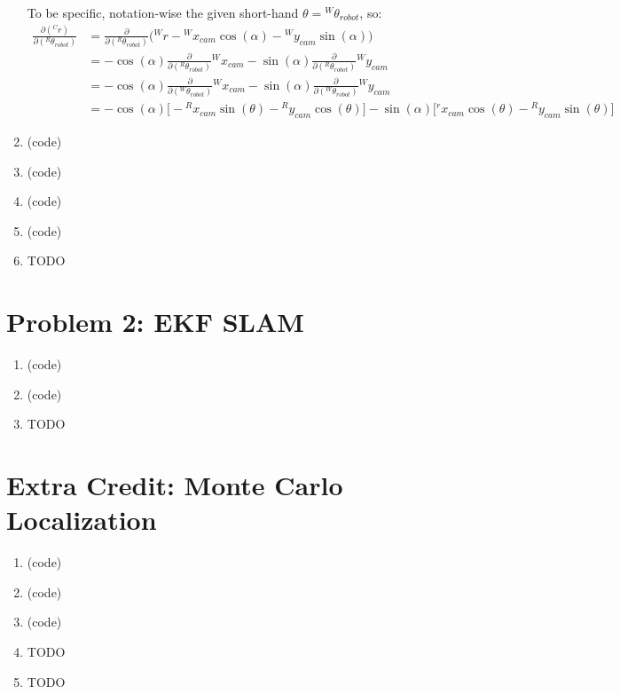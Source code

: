\documentclass{article}
\begin{document}
\begin{enumerate}[label=(\roman*)]
To be specific, notation-wise the given short-hand $\theta = {}^W\theta_{robot}$, so:
\begin{equation}
\begin{aligned}
\frac{\partial ({}^C r)}{\partial ({}^R \theta_{robot})}
&= \frac{\partial}{\partial ({}^R \theta_{robot})} \Big( {}^W r - {}^W x_{cam} \cos(\alpha) - {}^W y_{cam} \sin(\alpha) \Big) \\
&= -\cos(\alpha) \frac{\partial}{\partial ({}^R \theta_{robot})} {}^Wx_{cam} - \sin(\alpha) \frac{\partial}{\partial ({}^R \theta_{robot})} {}^Wy_{cam} \\
&= -\cos(\alpha) \frac{\partial}{\partial ({}^W \theta_{robot})} {}^Wx_{cam} - \sin(\alpha) \frac{\partial}{\partial ({}^W \theta_{robot})} {}^Wy_{cam} \\
&= -\cos(\alpha) \Big[ -{}^Rx_{cam} \sin(\theta) - {}^Ry_{cam} \cos(\theta) \Big] -\sin(\alpha) \Big[ {}^rx_{cam}\cos(\theta) - {}^Ry_{cam}\sin(\theta) \Big]
\end{aligned}
\end{equation}

\item %
(code)

\item %
(code)

\item %
(code)

\item %
(code)

\item %
TODO

\end{enumerate}

\section*{Problem 2: EKF SLAM}
\begin{enumerate}[label=(\roman*)]
\item %
(code)

\item %
(code)

\item %
TODO

\end{enumerate}

\section*{Extra Credit: Monte Carlo Localization}
\begin{enumerate}[label=(\roman*)]
\item %
(code)

\item %
(code)

\item %
(code)

\item %
TODO

\item %
TODO

\end{enumerate}
\end{document}
